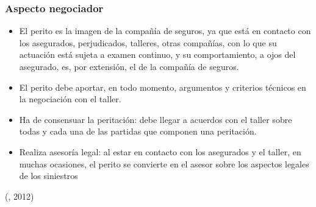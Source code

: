 \subsubsection{Aspecto negociador}
\begin{itemize}

\item El perito es la imagen de la compañía de seguros, ya que está en contacto con los asegurados, perjudicados, talleres, otras compañías, con lo que su actuación está sujeta a examen continuo, y su comportamiento, a ojos del asegurado, es, por extensión, el de la compañía de seguros. 

\item El perito debe aportar, en todo momento, argumentos y criterios técnicos en la negociación con el taller.

\item Ha de consensuar la peritación: debe llegar a acuerdos con el taller sobre todas y cada una de las partidas que componen una peritación.

\item Realiza asesoría legal: al estar en contacto con los asegurados y el taller, en muchas ocasiones, el perito se convierte en el asesor sobre los aspectos legales de los siniestros

\end{itemize}


(\citet{peritobib}, 2012)
\setlength{\parskip}{0mm}